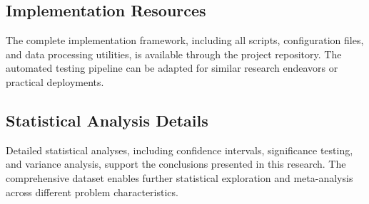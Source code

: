 \documentclass[11pt,a4paper]{article}
\begin{document}
\subsection{Implementation Resources}

The complete implementation framework, including all scripts, configuration files, and data processing utilities, is available through the project repository. The automated testing pipeline can be adapted for similar research endeavors or practical deployments.

\subsection{Statistical Analysis Details}

Detailed statistical analyses, including confidence intervals, significance testing, and variance analysis, support the conclusions presented in this research. The comprehensive dataset enables further statistical exploration and meta-analysis across different problem characteristics.
\end{document}
